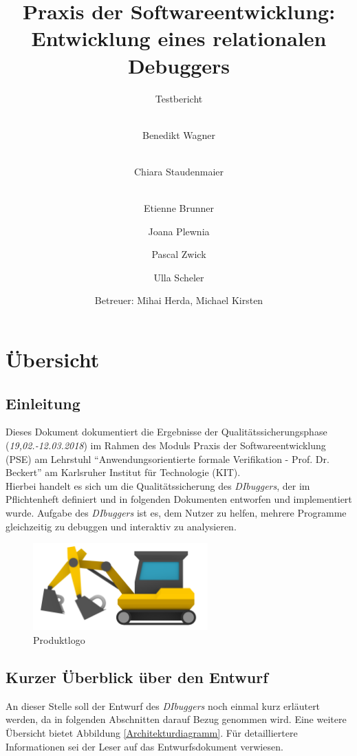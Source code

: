 \documentclass[parskip=full]{scrartcl}
\title{
	\vspace{2cm}
	\myfont 
	Praxis der Softwareentwicklung:\\ 
	Entwicklung eines relationalen Debuggers\\
}
\subtitle{
	\vspace{1cm}
	\myfont
	Testbericht
}
\author{
	\vspace{1cm} \\
	Benedikt Wagner\\
	\and 
        \vspace{1cm} \\ 
        Chiara Staudenmaier\\
        \and 
        \vspace{1cm} \\
        Etienne Brunner\\
	\and Joana Plewnia\\
	\and Pascal Zwick\\
	\and Ulla Scheler\\
	\vspace{1cm}
	\and Betreuer: Mihai Herda, Michael Kirsten
	\vspace{4cm}
}
\begin{document}
\clearpage
\maketitle
{}
\newpage

\tableofcontents
\newpage
{}

\section{Übersicht}

\subsection{Einleitung}
Dieses Dokument dokumentiert die Ergebnisse der Qualitätssicherungsphase (\textit{19,02.-12.03.2018}) im Rahmen des Moduls Praxis der Softwareentwicklung (PSE) am Lehrstuhl \enquote{Anwendungsorientierte formale Verifikation - Prof. Dr. Beckert} am Karlsruher Institut für Technologie (KIT).\\
Hierbei handelt es sich um die Qualitätssicherung des \textit{DIbuggers}, der im Pflichtenheft definiert und in folgenden Dokumenten entworfen und implementiert wurde. Aufgabe des \textit{DIbuggers} ist es, dem Nutzer zu helfen, mehrere Programme gleichzeitig zu debuggen und interaktiv zu analysieren. \\

\begin{figure}[!h]
\centering
\includegraphics[width=0.6\textwidth]{../Plichtenheft/logo_nongi.png}
\caption{Produktlogo}
\end{figure}

\subsection{Kurzer Überblick über den Entwurf}
An dieser Stelle soll der Entwurf des \textit{DIbuggers} noch einmal kurz erläutert werden, da in folgenden Abschnitten darauf Bezug genommen wird. Eine weitere Übersicht bietet Abbildung \ref{Architekturdiagramm}. Für detailliertere Informationen sei der Leser auf das Entwurfsdokument verwiesen.
\end{document}
